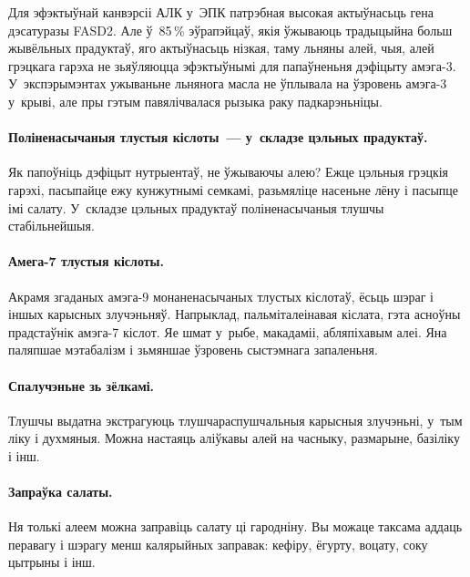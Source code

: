 Для эфэктыўнай канвэрсіі АЛК у~ЭПК патрэбная высокая актыўнасьць гена дэсатуразы FASD2. Але ў~85\,\% эўрапэйцаў, якія ўжываюць традыцыйна больш жывёльных прадуктаў, яго актыўнасьць нізкая, таму льняны алей, чыя, алей грэцкага гарэха не зьяўляюцца эфэктыўнымі для папаўненьня дэфіцыту амэга-3. У~экспэрымэнтах ужываньне льнянога масла не ўплывала на ўзровень амэга-3 у~крыві, але пры гэтым павялічвалася рызыка раку падкарэньніцы.

\paragraph{Поліненасычаныя тлустыя кіслоты~--- у~складзе цэльных прадуктаў.}
Як папоўніць дэфіцыт нутрыентаў, не ўжываючы алею? Ежце цэльныя грэцкія гарэхі, пасыпайце ежу кунжутнымі семкамі, разьмяліце насеньне лёну і пасыпце імі салату. У~складзе цэльных прадуктаў поліненасычаныя тлушчы стабільнейшыя.

\paragraph{Амега-7 тлустыя кіслоты.}
Акрамя згаданых амэга-9 монаненасычаных тлустых кіслотаў, ёсьць шэраг і іншых карысных злучэньняў. Напрыклад, пальміталеінавая кіслата, гэта асноўны прадстаўнік амэга-7 кіслот. Яе шмат у~рыбе, макадаміі, абляпіхавым алеі. Яна паляпшае мэтабалізм і зьмяншае ўзровень сыстэмнага запаленьня.

\paragraph{Спалучэньне зь зёлкамі.}
Тлушчы выдатна экстрагуюць тлушчараспушчальныя карысныя злучэньні, у~тым ліку і духмяныя. Можна настаяць аліўкавы алей на часныку, размарыне, базіліку і інш.

\paragraph{Запраўка салаты.}
Ня толькі алеем можна заправіць салату ці гародніну. Вы можаце таксама аддаць перавагу і шэрагу менш калярыйных заправак: кефіру, ёгурту, воцату, соку цытрыны і інш.

